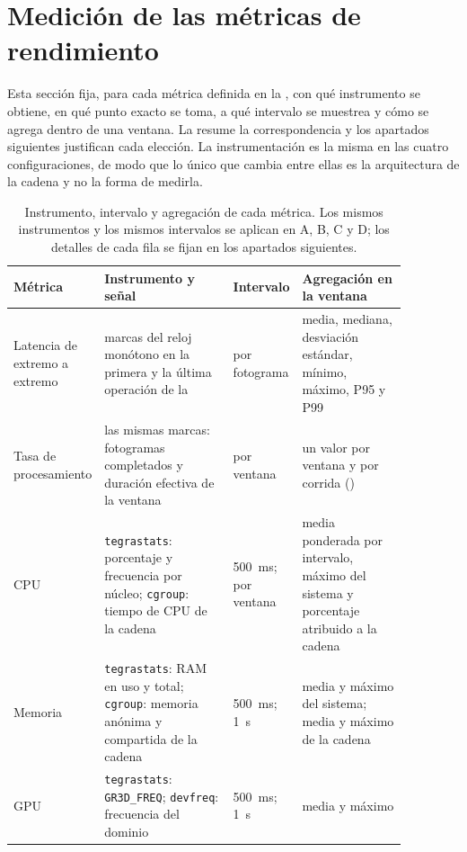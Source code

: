 \section{Medición de las métricas de rendimiento}
\label{sec:metric-measurement}

Esta sección fija, para cada métrica definida en la , con
qué instrumento se obtiene, en qué punto exacto se toma, a qué intervalo se
muestrea y cómo se agrega dentro de una ventana. La
 resume la correspondencia y los apartados
siguientes justifican cada elección. La instrumentación es la misma en las
cuatro configuraciones, de modo que lo único que cambia entre ellas es la
arquitectura de la cadena y no la forma de medirla.

\begin{table}[htbp]
  \centering
  \caption[Instrumento, intervalo y agregación de cada métrica]{Instrumento,
  intervalo y agregación de cada métrica. Los mismos instrumentos y los mismos
  intervalos se aplican en A, B, C y D; los detalles de cada fila se fijan en
  los apartados siguientes.}
  \label{tab:metric-instrumentation}
  \begin{tabular}{@{}L{0.13\linewidth}L{0.35\linewidth}L{0.11\linewidth}L{0.28\linewidth}@{}}
    \toprule
    \textbf{Métrica} & \textbf{Instrumento y señal} & \textbf{Intervalo} &
    \textbf{Agregación en la ventana} \\
    \midrule
    Latencia de extremo a extremo & marcas del reloj monótono en la primera y
      la última operación de la  & por fotograma &
      media, mediana, desviación estándar, mínimo, máximo, P95 y P99 \\
    Tasa de procesamiento & las mismas marcas: fotogramas completados y
      duración efectiva de la ventana & por ventana & un valor por ventana y
      por corrida () \\
    CPU & \texttt{tegrastats}: porcentaje y frecuencia por núcleo;
      \texttt{cgroup}: tiempo de CPU de la cadena & 500~ms; por ventana &
      media ponderada por intervalo, máximo del sistema y porcentaje
      atribuido a la cadena \\
    Memoria & \texttt{tegrastats}: RAM en uso y total; \texttt{cgroup}:
      memoria anónima y compartida de la cadena & 500~ms; 1~s &
      media y máximo del sistema; media y máximo de la cadena \\
    GPU & \texttt{tegrastats}: \texttt{GR3D\_FREQ};
      \texttt{devfreq}: frecuencia del dominio & 500~ms; 1~s & media y máximo

\end{tabular}
\end{table}
